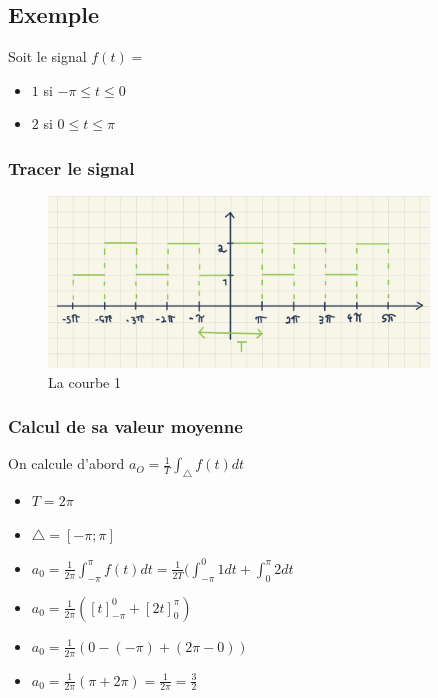 \documentclass[12pt, a4paper]{article}
\begin{document}
\subsection{Exemple}
Soit le signal $ f(t) = $
\begin{itemize}
    \item $ 1 $ si $ - \pi \leq t \leq 0 $
    \item $ 2 $ si $ 0 \leq t \leq \pi $
\end{itemize} 
\subsubsection{Tracer le signal}
\begin{figure}[H]
    \centering
    \includegraphics[width=0.9\textwidth]{img/courbe1.png}
    \caption{La courbe 1}
    \label{fig:courbe}
\end{figure}

\subsubsection{Calcul de sa valeur moyenne}

On calcule d'abord $ a_{O} = \frac{1}{T} \int_{\bigtriangleup}f(t) dt$\\[0.5cm]
\begin{itemize}
    \item $ T = 2\pi $\\
    \item $ \bigtriangleup = [- \pi; \pi] $\\
    \item $ a_{0} = \frac{1}{2 \pi} \int_{- \pi}^{\pi} f(t)dt = \frac{1}{2T}(\int_{- \pi}^{0} 1dt + \int_{0}^{\pi}2dt $\\
    \item $ a_{0} = \frac{1}{2\pi}([t]_{- \pi}^{0} + [2t]_{0}^{\pi}) $\\
    \item $ a_{0} = \frac{1}{2\pi}(0 - (- \pi) + (2 \pi - 0)) $\\
    \item $ a_{0} = \frac{1}{2\pi}(\pi + 2 \pi) = \frac{1}{2 \pi} = \frac{3}{2} $\\
\end{itemize}
\end{document}
